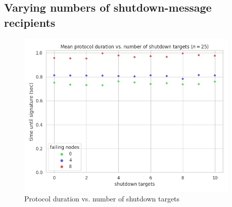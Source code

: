 \subsection*{Varying numbers of shutdown-message recipients}

\begin{figure}[H]
    \centering
    \includegraphics[width=0.95\textwidth]{figures/8/round_wall_sum_by_shutdown_targets.png}
    \captionsetup{labelformat=empty}
    \caption{Protocol duration vs. number of shutdown targets}
\end{figure}

